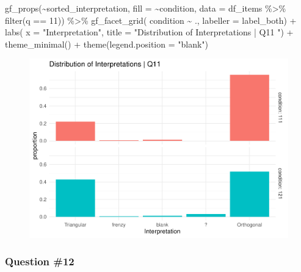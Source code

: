 \documentclass[
  letterpaper,
  DIV=11,
  numbers=noendperiod]{scrreprt}
\newenvironment{Shaded}{\begin{snugshade}}{\end{snugshade}}
\newcommand{\AttributeTok}[1]{\textcolor[rgb]{0.40,0.45,0.13}{#1}}
\newcommand{\DecValTok}[1]{\textcolor[rgb]{0.68,0.00,0.00}{#1}}
\newcommand{\FunctionTok}[1]{\textcolor[rgb]{0.28,0.35,0.67}{#1}}
\newcommand{\NormalTok}[1]{\textcolor[rgb]{0.00,0.23,0.31}{#1}}
\newcommand{\SpecialCharTok}[1]{\textcolor[rgb]{0.37,0.37,0.37}{#1}}
\newcommand{\StringTok}[1]{\textcolor[rgb]{0.13,0.47,0.30}{#1}}
\begin{document}
\begin{Shaded}
\begin{Highlighting}[]
\FunctionTok{gf\_props}\NormalTok{(}\SpecialCharTok{\textasciitilde{}}\NormalTok{sorted\_interpretation, }\AttributeTok{fill =} \SpecialCharTok{\textasciitilde{}}\NormalTok{condition, }\AttributeTok{data =}\NormalTok{ df\_items }\SpecialCharTok{\%\textgreater{}\%} \FunctionTok{filter}\NormalTok{(q }\SpecialCharTok{==} \DecValTok{11}\NormalTok{)) }\SpecialCharTok{\%\textgreater{}\%}
  \FunctionTok{gf\_facet\_grid}\NormalTok{( condition }\SpecialCharTok{\textasciitilde{}}\NormalTok{ ., }\AttributeTok{labeller =}\NormalTok{ label\_both) }\SpecialCharTok{+} 
  \FunctionTok{labs}\NormalTok{( }\AttributeTok{x =} \StringTok{"Interpretation"}\NormalTok{, }\AttributeTok{title =} \StringTok{"Distribution of Interpretations | Q11 "}\NormalTok{) }\SpecialCharTok{+} 
  \FunctionTok{theme\_minimal}\NormalTok{() }\SpecialCharTok{+} \FunctionTok{theme}\NormalTok{(}\AttributeTok{legend.position =} \StringTok{"blank"}\NormalTok{)}
\end{Highlighting}
\end{Shaded}

\begin{figure}[H]

{\centering \includegraphics{analysis/SGC3A/2_sgc3A_scoring_files/figure-pdf/Q11-distribution-2.pdf}

}

\end{figure}

\hypertarget{question-12}{%
\subsubsection{Question \#12}\label{question-12}}
\end{document}
